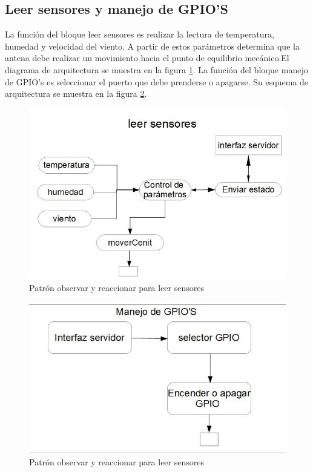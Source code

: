 \documentclass[12pt,a4paper, twosite]{article}
\begin{document}
	\subsection{Leer sensores y manejo de GPIO'S} 
	\label{sec:orga40b0ee}
	La función del bloque leer sensores es realizar la lectura de temperatura, humedad y velocidad del viento. A partir de estos parámetros determina que la antena debe realizar un movimiento hacia el punto de equilibrio mecánico.El diagrama de arquitectura se muestra en la figura \ref{fig:leer}.  
	La función del bloque manejo de GPIO's es seleccionar el puerto que debe prenderse o apagarse. Su esquema de arquitectura se muestra en la figura \ref{fig:gpios}. 
	\begin{figure}[!]
	\includegraphics{leerEncoders.jpg} 
	\caption{Patrón observar y reaccionar para leer sensores} 
	\label{fig:leer}
	\end{figure}
	
	\begin{figure}[!]
		\includegraphics[trim={1cm 0.3cm 0.5cm 0.2cm},clip]{manejoGPIOS.jpg} 
		\caption{Patrón observar y reaccionar para leer sensores} 
		\label{fig:gpios}
	\end{figure}
	
\end{document}
